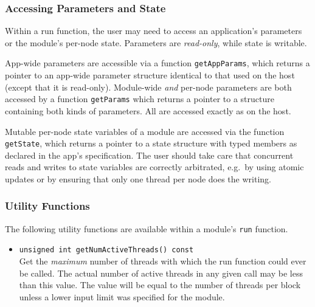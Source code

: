 \documentclass[11pt]{article}
\begin{document}
\subsubsection{Accessing Parameters and State}

Within a run function, the user may need to access an application's
parameters or the module's per-node state.  Parameters are
\emph{read-only}, while state is writable.

App-wide parameters are accessible via a function
\texttt{getAppParams}, which returns a pointer to an app-wide
parameter structure identical to that used on the host (except that it
is read-only).  Module-wide \emph{and} per-node parameters are both
accessed by a function \texttt{getParams} which returns a pointer to a
structure containing both kinds of parameters.  All are accessed
exactly as on the host.

Mutable per-node state variables of a module are accessed via the
function \texttt{getState}, which returns a pointer to a state
structure with typed members as declared in the app's specification.
The user should take care that concurrent reads and writes to state
variables are correctly arbitrated, e.g.\ by using atomic updates or
by ensuring that only one thread per node does the writing.

\subsubsection{Utility Functions}

The following utility functions are available within a module's
\texttt{run} function.

\begin{itemize}

\item \texttt{unsigned int getNumActiveThreads() const} \\
      Get the \emph{maximum} number of threads with which the run
      function could ever be called.  The actual number of active
      threads in any given call may be less than this value.  The
      value will be equal to the number of threads per block unless
      a lower input limit was specified for the module.



\end{itemize}
\end{document}

